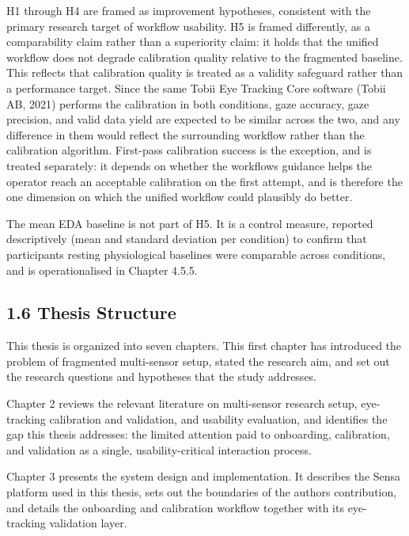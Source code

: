 \documentclass[
]{article}
\begin{document}
H1 through H4 are framed as improvement hypotheses, consistent with the primary research target of workflow usability. H5 is framed differently, as a comparability claim rather than a superiority claim: it holds that the unified workflow does not degrade calibration quality relative to the fragmented baseline. This reflects that calibration quality is treated as a validity safeguard rather than a performance target. Since the same Tobii Eye Tracking Core software (Tobii AB, 2021) performs the calibration in both conditions, gaze accuracy, gaze precision, and valid data yield are expected to be similar across the two, and any difference in them would reflect the surrounding workflow rather than the calibration algorithm. First-pass calibration success is the exception, and is treated separately: it depends on whether the workflow\textquotesingle s guidance helps the operator reach an acceptable calibration on the first attempt, and is therefore the one dimension on which the unified workflow could plausibly do better.

The mean EDA baseline is not part of H5. It is a control measure, reported descriptively (mean and standard deviation per condition) to confirm that participants\textquotesingle{} resting physiological baselines were comparable across conditions, and is operationalised in Chapter 4.5.5.

\hypertarget{thesis-structure}{%
\subsection{1.6 Thesis Structure}\label{thesis-structure}}

This thesis is organized into seven chapters. This first chapter has introduced the problem of fragmented multi-sensor setup, stated the research aim, and set out the research questions and hypotheses that the study addresses.

Chapter 2 reviews the relevant literature on multi-sensor research setup, eye-tracking calibration and validation, and usability evaluation, and identifies the gap this thesis addresses: the limited attention paid to onboarding, calibration, and validation as a single, usability-critical interaction process.

Chapter 3 presents the system design and implementation. It describes the Sensa platform used in this thesis, sets out the boundaries of the author\textquotesingle s contribution, and details the onboarding and calibration workflow together with its eye-tracking validation layer.
\end{document}
